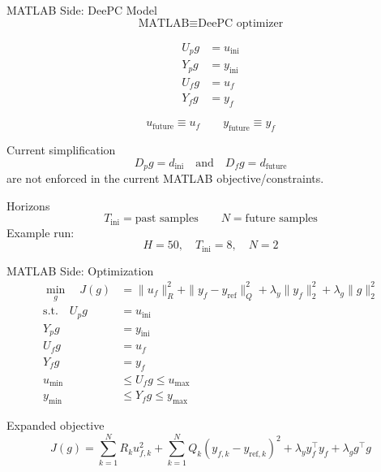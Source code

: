 \documentclass[aspectratio=1610]{beamer}
\begin{document}
\begin{frame}{MATLAB Side: DeePC Model}
\[
\text{MATLAB} \equiv \text{DeePC optimizer}
\]

\[
\begin{aligned}
U_p g &= u_{\mathrm{ini}} \\
Y_p g &= y_{\mathrm{ini}} \\
U_f g &= u_f \\
Y_f g &= y_f
\end{aligned}
\]

\[
u_{\mathrm{future}} \equiv u_f
\qquad
y_{\mathrm{future}} \equiv y_f
\]

\begin{block}{Current simplification}
\[
D_p g=d_{\mathrm{ini}}
\quad\text{and}\quad
D_f g=d_{\mathrm{future}}
\]
are not enforced in the current MATLAB objective/constraints.
\end{block}

\begin{block}{Horizons}
\[
T_{\mathrm{ini}}=\text{past samples}
\qquad
N=\text{future samples}
\]
Example run:
\[
H=50,\quad T_{\mathrm{ini}}=8,\quad N=2
\]
\end{block}
\end{frame}


\begin{frame}{MATLAB Side: Optimization}
\[
\begin{aligned}
\min_g \quad
J(g)
&=
\|u_f\|_R^2
+
\|y_f-y_{\mathrm{ref}}\|_Q^2
+
\lambda_y\|y_f\|_2^2
+
\lambda_g\|g\|_2^2
\\[0.2cm]
\text{s.t.}\quad
U_p g &= u_{\mathrm{ini}} \\
Y_p g &= y_{\mathrm{ini}} \\
U_f g &= u_f \\
Y_f g &= y_f \\
u_{\min} &\le U_f g \le u_{\max} \\
y_{\min} &\le Y_f g \le y_{\max}
\end{aligned}
\]

\begin{block}{Expanded objective}
\[
J(g)
=
\sum_{k=1}^{N} R_k u_{f,k}^2
+
\sum_{k=1}^{N} Q_k
\left(y_{f,k}-y_{\mathrm{ref},k}\right)^2
+
\lambda_y y_f^\top y_f
+
\lambda_g g^\top g
\]
\end{block}
\end{frame}

\end{document}
